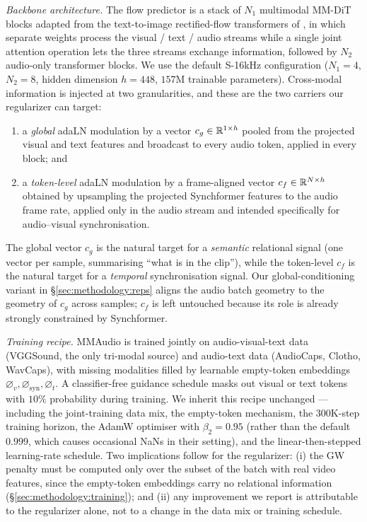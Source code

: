 \emph{Backbone architecture.} The flow predictor is a stack of
$N_1$ {multimodal MM-DiT blocks} adapted from the
text-to-image rectified-flow transformers of
\citet{esser_2024_scaling}, in which separate weights process the
visual / text / audio streams while a single joint
attention operation lets the three streams exchange information,
followed by $N_2$ audio-only transformer blocks. We use the
default S-16kHz configuration ($N_1 = 4$, $N_2 = 8$, hidden
dimension $h = 448$, $157$M trainable parameters). Cross-modal
information is injected at two granularities, and these are the
two carriers our regularizer can target:
\begin{enumerate}
  \item a \emph{global} adaLN modulation by a vector
    $c_g \in \mathbb{R}^{1 \times h}$ pooled from the projected visual
    and text features and broadcast to every audio token, applied
    in every block; and
  \item a \emph{token-level} adaLN modulation by a frame-aligned
    vector $c_f \in \mathbb{R}^{N \times h}$ obtained by upsampling the
    projected Synchformer features to the audio frame rate, applied
    only in the audio stream and intended specifically for
    audio--visual synchronisation.
\end{enumerate}
The global vector $c_g$ is the natural target for a
\emph{semantic} relational signal (one vector per sample, summarising
``what is in the clip''), while the token-level $c_f$ is the
natural target for a \emph{temporal} synchronisation signal. Our
global-conditioning variant in \S\ref{sec:methodology:reps} aligns the
audio batch geometry to the geometry of $c_g$ across samples;
$c_f$ is left untouched because its role is already strongly
constrained by Synchformer.

\emph{Training recipe.} MMAudio is trained jointly on
audio-visual-text data (VGGSound, the only tri-modal source) and
audio-text data (AudioCaps, Clotho, WavCaps), with missing
modalities filled by learnable empty-token embeddings $\varnothing_v,
\varnothing_{\mathrm{syn}}, \varnothing_t$. A classifier-free
guidance schedule masks out visual or text tokens with $10\%$
probability during training. We inherit this recipe unchanged ---
including the joint-training data mix, the empty-token mechanism,
the $300\text{K}$-step training horizon, the AdamW optimiser with
$\beta_2 = 0.95$ (rather than the default $0.999$, which causes
occasional NaNs in their setting), and the linear-then-stepped
learning-rate schedule. Two implications follow for the
regularizer: (i) the GW penalty must be computed only over the
subset of the batch with real video features, since the
empty-token embeddings carry no relational information
(\S\ref{sec:methodology:training}); and (ii) any improvement we
report is attributable to the regularizer alone, not to a change
in the data mix or training schedule.

